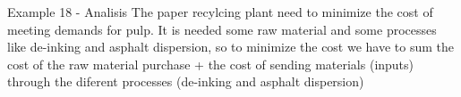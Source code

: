 \begin{frame}{Example 18 - Analisis}
The paper recylcing plant need to minimize the cost of meeting demands for pulp.
It is needed some raw material and some processes like de-inking and asphalt
dispersion, so to minimize the cost we have to sum the cost of the raw material
purchase + the cost of sending materials (inputs) through the diferent processes
(de-inking and asphalt dispersion)

\end{frame}
